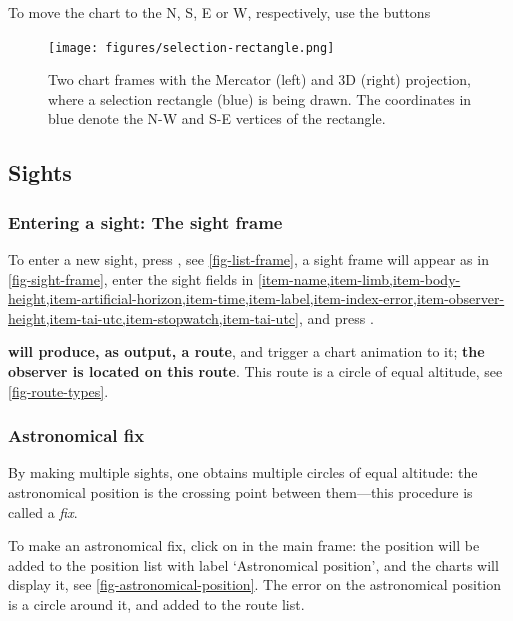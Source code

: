 \documentclass{ol-softwaremanual}
\begin{document}
To move the chart to the \ac{N}, \ac{S}, \ac{E} or \ac{W}, respectively, use the buttons

\begin{figure}
  \centering
  \texttt{[image: figures/selection-rectangle.png]}
  \caption{
    \label{fig-selection-rectangle}
    Two chart frames with the Mercator (left) and 3D (right) projection, where a selection rectangle (blue) is being drawn. The coordinates in blue denote the \acl{N}-\ac{W} and \acl{S}-\acl{E} vertices of the rectangle. 
  }
\end{figure}



\subsection{Sights}

\subsubsection{Entering a sight: The sight frame}


To enter a new sight, press  , see \cref{fig-list-frame}, a sight frame will appear as in \cref{fig-sight-frame}, enter the sight fields in  \cref{item-name,item-limb,item-body-height,item-artificial-horizon,item-time,item-label,item-index-error,item-observer-height,item-tai-utc,item-stopwatch,item-tai-utc}, and press . 

\textbf{\thel will produce, as output, a route}, and trigger a chart animation to it; \textbf{the observer is located  on this route}. This route is a circle of equal altitude, see \cref{fig-route-types}. 

\subsubsection{Astronomical fix}

By making multiple sights, one obtains multiple circles of equal altitude: the astronomical position is the crossing point between them---this procedure is called a \textit{fix}. 

To make an astronomical fix, click on  in the main frame: the position will be added to the position list with label `Astronomical position', and the charts will display it, see \cref{fig-astronomical-position}. The error on the astronomical position is a circle around it, and added to the route list. 
\end{document}
